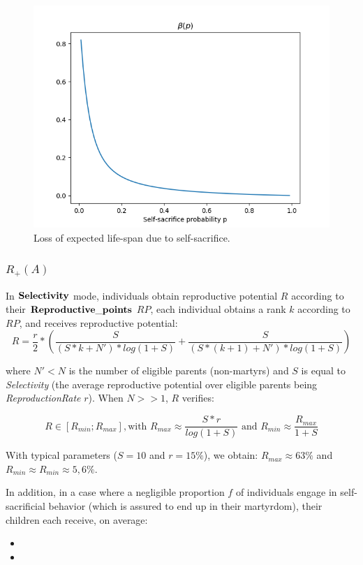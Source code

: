 \documentclass[a4paper,12pt]{article}
\begin{document}
\begin{figure}[h]
    \centering
    \includegraphics[width=1\textwidth]{Beta}
    \caption{Loss of expected life-span due to self-sacrifice.}
    \label{fig:beta}
    \end{figure}
    



\subsubsection{$R_{+}(A)$}

In $\bf{Selectivity}$ mode, individuals obtain reproductive potential $R$ according to their
$\bf{Reproductive\_points}$ $RP$, each individual obtains a rank $k$
according to $RP$, and receives reproductive potential:
\[ R = \frac{r}{2} * (\frac{S}
{(S*k + N')*log(1+S)} + \frac{S}{(S*(k+1) + N')*log(1+S)}) \]

where $N'<N$ is the number of eligible parents (non-martyrs) and $S$ is equal to \emph{Selectivity}
(the average reproductive potential over eligible parents being \emph{ReproductionRate} $r$).
When $N >> 1$, $R$ verifies:

\begin{equation}
    R \in [R_{min};R_{max}], \textrm{with } R_{max} \approx \frac{S*r}{log(1+S)} 
    \textrm{ and } R_{min} \approx
    \frac{R_{max}}{1+S}
\label{eq:ReproPot}
\end{equation}

With typical parameters ($S=10$ and $r=15\%$), we obtain: $R_{max} \approx 63 \%$ and 
$R_{min} \approx R_{min} \approx 5,6 \%$.

In addition, in a case where a negligible proportion $f$ of individuals engage in
self-sacrificial behavior (which is assured to end up in their martyrdom), their children each
receive, on average:
\begin{itemize}
\item 
\item 

\end{itemize}
\end{document}

